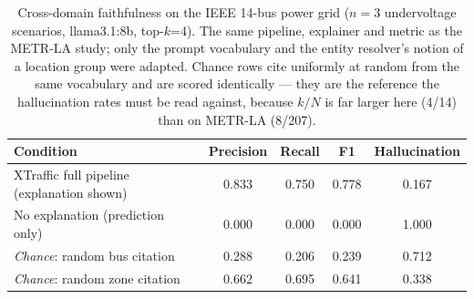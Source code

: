 \begin{table}[t]
\centering
\caption{Cross-domain faithfulness on the IEEE 14-bus power grid ($n=3$ undervoltage scenarios, llama3.1:8b, top-$k$=4). The same pipeline, explainer and metric as the METR-LA study; only the prompt vocabulary and the entity resolver's notion of a location group were adapted. Chance rows cite uniformly at random from the same vocabulary and are scored identically --- they are the reference the hallucination rates must be read against, because $k/N$ is far larger here (4/14) than on METR-LA (8/207).}
\label{tab:power_grid_faith}
\begin{tabular}{lcccc}
\toprule
Condition & Precision & Recall & F1 & Hallucination \\
\midrule
XTraffic full pipeline (explanation shown) & 0.833 & 0.750 & 0.778 & 0.167 \\
No explanation (prediction only) & 0.000 & 0.000 & 0.000 & 1.000 \\
\emph{Chance}: random bus citation & 0.288 & 0.206 & 0.239 & 0.712 \\
\emph{Chance}: random zone citation & 0.662 & 0.695 & 0.641 & 0.338 \\
\bottomrule
\end{tabular}
\end{table}
